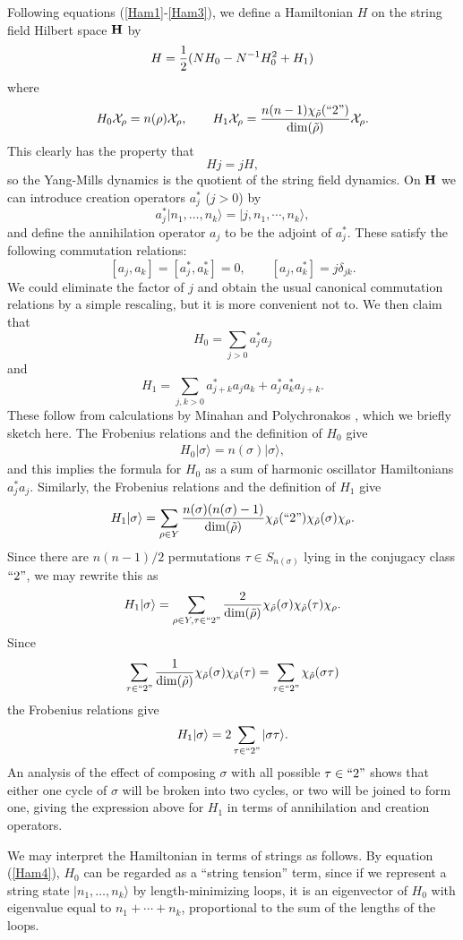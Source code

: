 \documentclass[12pt]{article}
\newcommand{\ba}{\begin{eqnarray}}
\newcommand{\Chi}{{\cal X}}
\newcommand{\ea}{\end{eqnarray}}
\renewcommand{\H}{{\bf H}}
\newcommand{\hf}{{1\over 2}}
\begin{document}
Following equations (\ref{Ham1}-\ref{Ham3}),
we define a Hamiltonian $H$ on the string field Hilbert space $\H$ by
\[      H = \hf(N H_0 - N^{-1} H_0^2 + H_1)  \]
where
\[    H_0 \Chi_\rho =  n(\rho)\Chi_\rho  ,\qquad
  H_1 \Chi_\rho =  {n(n-1)\chi_{\tilde\rho}(``2")\over \dim(\tilde\rho)}
\Chi_\rho.  \]
This clearly has the property that
\[             H j = j H ,\]
so the Yang-Mills dynamics is the quotient of the string field
dynamics.
On $\H$ we can introduce creation operators $a_j^\ast$ ($j > 0$) by
\[       a_j^\ast |n_1, \dots, n_k\rangle =  |j, n_1,
\cdots, n_k\rangle  ,\]
and define the
annihilation operator $a_j$ to be the adjoint of $a_j^\ast$.
These satisfy the following commutation relations:
\[     [a_j,a_k] = [a^\ast_j, a^\ast_k] = 0 ,\qquad
     [a_j, a^\ast_k] = j\delta_{jk}  .\]
We could eliminate the factor of $j$ and obtain the usual canonical
commutation relations by a simple rescaling, but it is more convenient
not to.   We then claim that
\[         H_0 = \sum_{j > 0}  a^\ast_j a_j  \]
and
\[         H_1 = \sum_{j,k > 0}  a^\ast_{j+k} a_j a_k +
a^\ast_j a^\ast_k a_{j+k}  .\]
These follow from calculations by Minahan and Polychronakos
\cite{MP}, which we briefly sketch here.  The Frobenius relations
and the definition of $H_0$ give
\ba          H_0 |\sigma\rangle = n(\sigma) |\sigma\rangle ,
\label{Ham4} \ea
and this implies the formula for $H_0$ as a sum of harmonic oscillator
Hamiltonians $a^\ast_j a_j$.  Similarly, the Frobenius relations and
the definition of $H_1$ give
\[      H_1 |\sigma\rangle =  \sum_{\rho\in Y} {n(\sigma)(n(\sigma)-1)\over
\dim(\tilde \rho)} \chi_{\tilde\rho}(``2") \chi_{\tilde\rho}(\sigma)
\chi_\rho  .\]
Since there are $n(n-1)/2$ permutations $\tau \in S_{n(\sigma)}$ lying in
the conjugacy class $``2"$, we may rewrite this as
\[      H_1 |\sigma\rangle =  \sum_{\rho\in Y, \tau \in ``2"}
{2\over \dim(\tilde \rho)}
\chi_{\tilde\rho}(\sigma) \chi_{\tilde\rho}(\tau) \chi_\rho  .\]
Since
\[        \sum_{\tau \in ``2"} {1\over \dim(\tilde\rho)}
\chi_{\tilde\rho}(\sigma) \chi_{\tilde\rho}(\tau) =
\sum_{\tau \in ``2"} \chi_{\tilde\rho}(\sigma\tau)  \]
the Frobenius relations give
\ba      H_1 |\sigma\rangle =  2\sum_{\tau \in ``2"}
|\sigma\tau\rangle  .\label{Ham5}  \ea
An analysis of the effect of composing $\sigma$ with all possible
$\tau \in ``2"$ shows that either one cycle of $\sigma$ will be broken
into two cycles, or two will be joined to form one, giving the
expression above for $H_1$ in terms of annihilation and creation
operators.

We may interpret the Hamiltonian in terms of strings
as follows.  By equation (\ref{Ham4}),
$H_0$ can be regarded as a ``string
tension'' term, since if we represent a string state $|n_1, \dots,
n_k\rangle$ by length-minimizing loops, it is an eigenvector of $H_0$
with eigenvalue equal to $n_1 + \cdots + n_k$, proportional to
the sum of the lengths of the loops.
\end{document}
